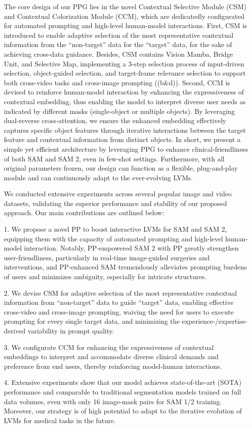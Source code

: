The core design of our PPG lies in the novel Contextual Selective Module (CSM) and Contextual Colorization Module (CCM), which are dedicatedly configurated for automated prompting and high-level human-model interactions. First, CSM is introduced to enable adaptive selection of the most representative contextual information from the ``non-target'' data for the ``target'' data, for the sake of achieving cross-data guidance. Besides, CSM contains Vision Mamba, Bridge Unit, and Selective Map, implementing a 3-step selection process of input-driven selection, object-guided selection, and target-frame relevance selection to support both cross-video tasks and cross-image prompting ((b\&d)). Second, CCM is devised to reinforce human-model interaction by enhancing the expressiveness of contextual embedding, thus enabling the model to interpret diverse user needs as indicated by different masks (\eg single-object or multiple objects). By leveraging dual-reverse cross-attention, we ensure the enhanced embedding effectively captures specific object features through iterative interactions between the target feature and contextual information from distinct objects. In short, we present a simple yet efficient architecture by leveraging PPG to enhance clinical-friendliness of both SAM and SAM 2, even in few-shot settings. Furthermore, with all original parameters frozen, our design can function as a flexible, plug-and-play module and can continuously adapt to the ever-evolving LVMs.

We conducted extensive experiments across several popular image and video datasets, validating the superior performance and stability of our proposed approach. Our main contributions are outlined below:

1. We propose a novel PP to boost interactive LVMs for SAM and SAM 2, equipping them with the capacity of automated prompting and high-level human-model interaction. Notably, PP-empowered SAM 2 with PP greatly strengthen user-friendliness, particularly in real-time image-guided surgeries and interventions, and PP-enhanced SAM tremendously alleviates prompting burdens of users and minimizes ambiguity, especially for intricate structures.

2. We devise CSM for adaptive selection of the most representative contextual information from “non-target” data to guide “target” data, enabling effective cross-video and cross-image prompting, waiving the need for users to execute prompting for every single target data, and minimizing the experience-/expertise-derived variability in prompt quality. 

3. We configurate CCM for enhancing the expressiveness of contextual embeddings to interpret and accommodate diverse clinical demands and preference from end users, thereby reinforcing model-human interactions.

4. Extensive experiments show that our model achieves state-of-the-art (SOTA) performance and comparable to traditional segmentation models trained on full data volumes, even with only 16 image-mask pairs for SAM 1/2 training. Moreover, our strategy is of high potential to adapt to the iterative evolution of LVMs for medical tasks in the future.
